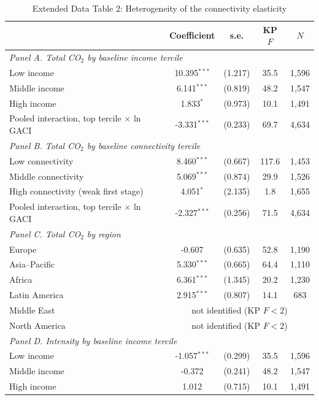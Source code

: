 \begin{table}[htbp]
\centering
\begin{threeparttable}
\caption{Extended Data Table 2: Heterogeneity of the connectivity elasticity}
\label{tab:hetero}
\footnotesize
\begin{tabular}{lcccc}
\toprule
 & Coefficient & s.e. & KP $F$ & $N$ \\
\midrule
\multicolumn{5}{l}{\textit{Panel A. Total CO$_2$ by baseline income tercile}} \\
  Low income & 10.395$^{***}$ & (1.217) & 35.5 & 1,596 \\
  Middle income & 6.141$^{***}$ & (0.819) & 48.2 & 1,547 \\
  High income & 1.833$^{*}$ & (0.973) & 10.1 & 1,491 \\
  \quad Pooled interaction, top tercile $\times$ ln GACI & -3.331$^{***}$ & (0.233) & 69.7 & 4,634 \\
\midrule
\multicolumn{5}{l}{\textit{Panel B. Total CO$_2$ by baseline connectivity tercile}} \\
  Low connectivity & 8.460$^{***}$ & (0.667) & 117.6 & 1,453 \\
  Middle connectivity & 5.069$^{***}$ & (0.874) & 29.9 & 1,526 \\
  High connectivity (weak first stage) & 4.051$^{*}$ & (2.135) & 1.8 & 1,655 \\
  \quad Pooled interaction, top tercile $\times$ ln GACI & -2.327$^{***}$ & (0.256) & 71.5 & 4,634 \\
\midrule
\multicolumn{5}{l}{\textit{Panel C. Total CO$_2$ by region}} \\
  Europe & -0.607 & (0.635) & 52.8 & 1,190 \\
  Asia--Pacific & 5.330$^{***}$ & (0.665) & 64.4 & 1,110 \\
  Africa & 6.361$^{***}$ & (1.345) & 20.2 & 1,230 \\
  Latin America & 2.915$^{***}$ & (0.807) & 14.1 & 683 \\
  Middle East & \multicolumn{4}{c}{not identified (KP $F<2$)} \\
  North America & \multicolumn{4}{c}{not identified (KP $F<2$)} \\
\midrule
\multicolumn{5}{l}{\textit{Panel D. Intensity by baseline income tercile}} \\
  Low income & -1.057$^{***}$ & (0.299) & 35.5 & 1,596 \\
  Middle income & -0.372 & (0.241) & 48.2 & 1,547 \\
  High income & 1.012 & (0.715) & 10.1 & 1,491 \\

\end{tabular}
\end{threeparttable}
\end{table}
